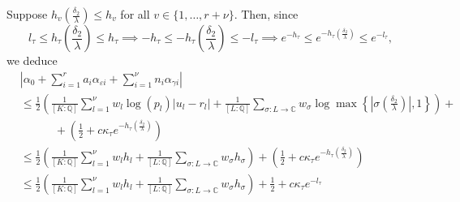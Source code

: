 Suppose $h_{v}\left(\frac{\delta_2}{\lambda}\right) \leq h_v$ for all $v\in \{1, \dots, r+\nu\}$. Then, since
\[l_{\tau} \leq h_{\tau}\left(\frac{\delta_2}{\lambda}\right) \leq h_{\tau} \implies -h_{\tau} \leq  -h_{\tau}\left(\frac{\delta_2}{\lambda}\right) \leq -l_{\tau} \implies e^{-h_{\tau}} \leq e^{-h_{\tau}\left(\frac{\delta_2}{\lambda}\right)} \leq e^{-l_{\tau}},\]
 we deduce
\begin{align*}
&\left|\alpha_0+\sum_{i = 1}^r a_i \alpha_{\varepsilon i} + \sum_{i = 1}^{\nu} n_i \alpha_{\gamma i}\right|\\
	& \leq \frac{1}{2}\left(\frac{1}{[K:\mathbb{Q}]}\sum_{l = 1}^{\nu}w_l \log(p_l)|u_l - r_l| + \frac{1}{[L:\mathbb{Q}]}\sum_{\sigma :L \to \mathbb{C}} w_{\sigma}\log \max \left\{ \left|\sigma\left(\frac{\delta_2}{\lambda}\right)\right|, 1\right\} \right) + \\
	& \quad \quad \quad + \left(\frac{1}{2} + c\kappa_{\tau}e^{-h_{\tau}\left(\frac{\delta_2}{\lambda}\right)}\right)\\
	& \leq \frac{1}{2}\left(\frac{1}{[K:\mathbb{Q}]}\sum_{l = 1}^{\nu}w_l h_l + \frac{1}{[L:\mathbb{Q}]}\sum_{\sigma :L \to \mathbb{C}} w_{\sigma}h_{\sigma} \right) + \left(\frac{1}{2} + c\kappa_{\tau}e^{-h_{\tau}\left(\frac{\delta_2}{\lambda}\right)}\right)\\
	& \leq \frac{1}{2}\left(\frac{1}{[K:\mathbb{Q}]}\sum_{l = 1}^{\nu}w_l h_l + \frac{1}{[L:\mathbb{Q}]}\sum_{\sigma :L \to \mathbb{C}} w_{\sigma}h_{\sigma} \right) + \frac{1}{2} + c\kappa_{\tau}e^{-l_{\tau}}
\end{align*} 
%

